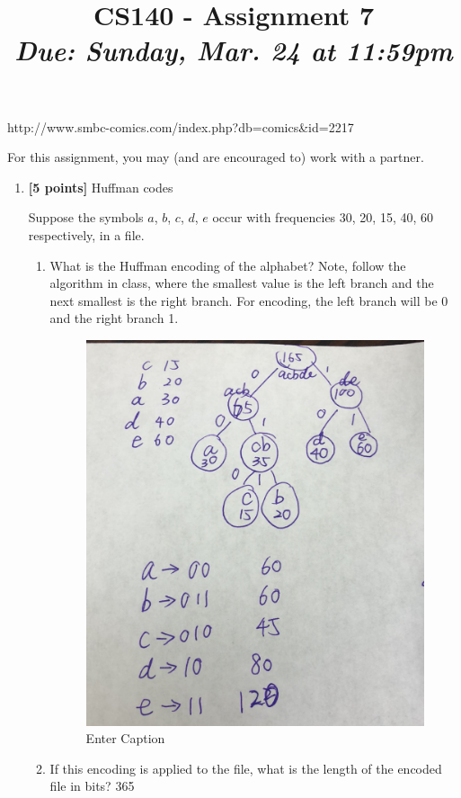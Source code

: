 \documentclass[11pt]{article}
\title{CS140 - Assignment 7\\\small{\emph{Due: Sunday, Mar. 24 at 11:59pm}}}
\author{}
\date{}
\begin{document}
\maketitle

\begin{center}
\footnotesize{http://www.smbc-comics.com/index.php?db=comics\&id=2217}
\end{center}

\newpage

\noindent For this assignment, you may (and are encouraged to) work with a partner.

\begin{enumerate}

\item \textbf{[5 points]} Huffman codes

Suppose the symbols $a$, $b$, $c$, $d$, $e$ occur with frequencies 30, 20, 15, 40, 60 respectively, in a file.

\begin{enumerate}

\item What is the Huffman encoding of the alphabet?  Note, follow the algorithm in class, where the smallest value is the left branch and the next smallest is the right branch.  For encoding, the left branch will be 0 and the right branch 1.

\begin{figure}
    \centering
    \includegraphics[width=0.5\linewidth]{image.png}
    \caption{Enter Caption}
    \label{fig:enter-label}
\end{figure}
\item If this encoding is applied to the file, what is the length of the encoded file in bits?
 365    

\end{enumerate}
\end{enumerate}
\end{document}
